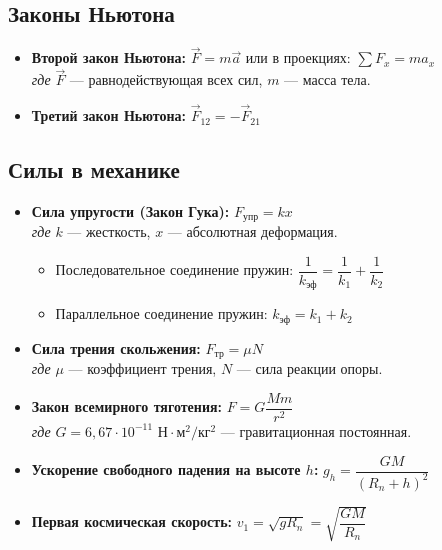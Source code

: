 \documentclass[11pt, a4paper]{article}
\begin{document}
\subsection{Законы Ньютона}
\begin{itemize}
    \item \textbf{Второй закон Ньютона:} $\vec{F} = m\vec{a}$ \quad или в проекциях: $\sum F_x = m a_x$ \\
    \textit{где} $\vec{F}$ --- равнодействующая всех сил, $m$ --- масса тела.
    
    \item \textbf{Третий закон Ньютона:} $\vec{F}_{12} = -\vec{F}_{21}$
\end{itemize}

\subsection{Силы в механике}
\begin{itemize}
    \item \textbf{Сила упругости (Закон Гука):} $F_{\text{упр}} = k x$ \\
    \textit{где} $k$ --- жесткость, $x$ --- абсолютная деформация.
    \begin{itemize}
        \item Последовательное соединение пружин: $\dfrac{1}{k_{\text{эф}}} = \dfrac{1}{k_1} + \dfrac{1}{k_2}$
        \item Параллельное соединение пружин: $k_{\text{эф}} = k_1 + k_2$
    \end{itemize}

    \item \textbf{Сила трения скольжения:} $F_{\text{тр}} = \mu N$ \\
    \textit{где} $\mu$ --- коэффициент трения, $N$ --- сила реакции опоры.

    \item \textbf{Закон всемирного тяготения:} $F = G \dfrac{M m}{r^2}$ \\
    \textit{где} $G = 6,67 \cdot 10^{-11} \text{ Н}\cdot\text{м}^2/\text{кг}^2$ --- гравитационная постоянная.

    \item \textbf{Ускорение свободного падения на высоте $h$:} $g_h = \dfrac{G M}{(R_n + h)^2}$
    
    \item \textbf{Первая космическая скорость:} $v_1 = \sqrt{g R_n} = \sqrt{\dfrac{G M}{R_n}}$
\end{itemize}
\end{document}
